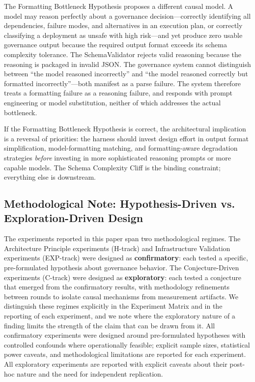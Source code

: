 \documentclass[11pt,a4paper]{article}
\begin{document}
The Formatting Bottleneck Hypothesis proposes a different causal model. A model may reason perfectly about a governance decision---correctly identifying all dependencies, failure modes, and alternatives in an execution plan, or correctly classifying a deployment as unsafe with high risk---and yet produce zero usable governance output because the required output format exceeds its schema complexity tolerance. The SchemaValidator rejects valid reasoning because the reasoning is packaged in invalid JSON. The governance system cannot distinguish between ``the model reasoned incorrectly'' and ``the model reasoned correctly but formatted incorrectly''---both manifest as a parse failure. The system therefore treats a formatting failure as a reasoning failure, and responds with prompt engineering or model substitution, neither of which addresses the actual bottleneck.

If the Formatting Bottleneck Hypothesis is correct, the architectural implication is a reversal of priorities: the harness should invest design effort in output format simplification, model-formatting matching, and formatting-aware degradation strategies \textit{before} investing in more sophisticated reasoning prompts or more capable models. The Schema Complexity Cliff is the binding constraint; everything else is downstream.

\subsection{Methodological Note: Hypothesis-Driven vs. Exploration-Driven Design}

The experiments reported in this paper span two methodological regimes. The Architecture Principle experiments (H-track) and Infrastructure Validation experiments (EXP-track) were designed as \textbf{confirmatory}: each tested a specific, pre-formulated hypothesis about governance behavior. The Conjecture-Driven experiments (C-track) were designed as \textbf{exploratory}: each tested a conjecture that emerged from the confirmatory results, with methodology refinements between rounds to isolate causal mechanisms from measurement artifacts. We distinguish these regimes explicitly in the Experiment Matrix and in the reporting of each experiment, and we note where the exploratory nature of a finding limits the strength of the claim that can be drawn from it. All confirmatory experiments were designed around pre-formulated hypotheses with controlled confounds where operationally feasible; explicit sample sizes, statistical power caveats, and methodological limitations are reported for each experiment. All exploratory experiments are reported with explicit caveats about their post-hoc nature and the need for independent replication.
\end{document}
